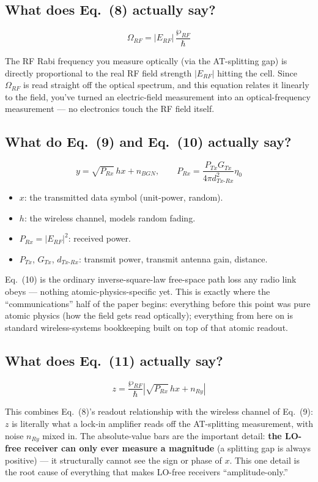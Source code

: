 \documentclass[11pt]{article}
\begin{document}
\subsection*{What does Eq.~(8) actually say?}
\[
\Omega_{RF} = |E_{RF}|\,\frac{\wp_{RF}}{\hbar}
\]
\begin{eqmeaning}
The RF Rabi frequency you measure optically (via the AT-splitting gap) is directly proportional to the real RF field strength $|E_{RF}|$ hitting the cell. Since $\Omega_{RF}$ is read straight off the optical spectrum, and this equation relates it linearly to the field, you've turned an electric-field measurement into an optical-frequency measurement --- no electronics touch the RF field itself.
\end{eqmeaning}

\subsection*{What do Eq.~(9) and Eq.~(10) actually say?}
\[
y = \sqrt{P_{Rx}}\,hx + n_{BGN}, \qquad P_{Rx}=\frac{P_{Tx}G_{Tx}}{4\pi d_{Tx\text{-}Rx}^2}\eta_0
\]
\begin{itemize}
\item $x$: the transmitted data symbol (unit-power, random).
\item $h$: the wireless channel, models random fading.
\item $P_{Rx}=|E_{RF}|^2$: received power.
\item $P_{Tx}$, $G_{Tx}$, $d_{Tx\text{-}Rx}$: transmit power, transmit antenna gain, distance.
\end{itemize}
\begin{eqmeaning}
Eq.~(10) is the ordinary inverse-square-law free-space path loss any radio link obeys --- nothing atomic-physics-specific yet. This is exactly where the ``communications'' half of the paper begins: everything before this point was pure atomic physics (how the field gets read optically); everything from here on is standard wireless-systems bookkeeping built on top of that atomic readout.
\end{eqmeaning}

\subsection*{What does Eq.~(11) actually say?}
\[
z = \frac{\wp_{RF}}{\hbar}\left|\sqrt{P_{Rx}}\,hx+n_{Ry}\right|
\]
\begin{eqmeaning}
This combines Eq.~(8)'s readout relationship with the wireless channel of Eq.~(9): $z$ is literally what a lock-in amplifier reads off the AT-splitting measurement, with noise $n_{Ry}$ mixed in. The absolute-value bars are the important detail: \textbf{the LO-free receiver can only ever measure a magnitude} (a splitting gap is always positive) --- it structurally cannot see the sign or phase of $x$. This one detail is the root cause of everything that makes LO-free receivers ``amplitude-only.''
\end{eqmeaning}
\end{document}
